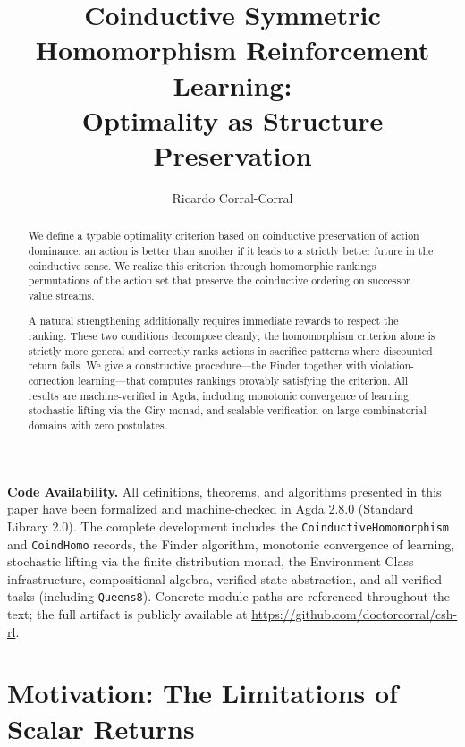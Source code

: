 \documentclass[runningheads]{llncs}
\title{Coinductive Symmetric Homomorphism Reinforcement Learning:\\
Optimality as Structure Preservation}
\author{Ricardo Corral-Corral}
\institute{Independent Researcher, Chihuahua, Mexico\\
\email{ricardo@gyx.ai}}
\begin{document}
\maketitle

\begin{abstract}
We define a typable optimality criterion based on coinductive preservation of action dominance: an action is better than another if it leads to a strictly better future in the coinductive sense.
We realize this criterion through homomorphic rankings---permutations of the action set that preserve the coinductive ordering on successor value streams.

A natural strengthening additionally requires immediate rewards to respect the ranking.
These two conditions decompose cleanly; the homomorphism criterion alone is strictly more general and correctly ranks actions in sacrifice patterns where discounted return fails.
We give a constructive procedure---the Finder together with violation-correction learning---that computes rankings provably satisfying the criterion.
All results are machine-verified in Agda, including monotonic convergence of learning, stochastic lifting via the Giry monad, and scalable verification on large combinatorial domains with zero postulates.

\end{abstract}

\noindent\textbf{Code Availability.}
All definitions, theorems, and algorithms presented in this paper have been formalized and machine-checked in Agda 2.8.0 (Standard Library 2.0).
The complete development includes the \texttt{CoinductiveHomomorphism} and \texttt{CoindHomo} records, the Finder algorithm, monotonic convergence of learning, stochastic lifting via the finite distribution monad, the Environment Class infrastructure, compositional algebra, verified state abstraction, and all verified tasks (including \texttt{Queens8}).
Concrete module paths are referenced throughout the text; the full artifact is publicly available at \url{https://github.com/doctorcorral/csh-rl}.


\section{Motivation: The Limitations of Scalar Returns}
\end{document}
